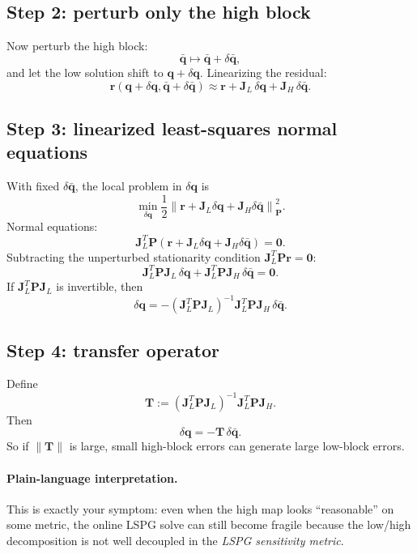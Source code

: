 \documentclass[11pt]{article}
\begin{document}
\subsection*{Step 2: perturb only the high block}
Now perturb the high block:
\[
\bar{\mathbf q}\mapsto \bar{\mathbf q}+\delta\bar{\mathbf q},
\]
and let the low solution shift to $\mathbf q+\delta\mathbf q$.
Linearizing the residual:
\[
\mathbf r(\mathbf q+\delta\mathbf q,\bar{\mathbf q}+\delta\bar{\mathbf q})
\approx
\mathbf r
+\mathbf J_L\,\delta\mathbf q
+\mathbf J_H\,\delta\bar{\mathbf q}.
\]

\subsection*{Step 3: linearized least-squares normal equations}
With fixed $\delta\bar{\mathbf q}$, the local problem in $\delta\mathbf q$ is
\[
\min_{\delta\mathbf q}
\frac12
\left\|
\mathbf r+\mathbf J_L\delta\mathbf q+\mathbf J_H\delta\bar{\mathbf q}
\right\|_{\mathbf P}^2.
\]
Normal equations:
\[
\mathbf J_L^T\mathbf P
\left(
\mathbf r+\mathbf J_L\delta\mathbf q+\mathbf J_H\delta\bar{\mathbf q}
\right)
=
\mathbf0.
\]
Subtracting the unperturbed stationarity condition $\mathbf J_L^T\mathbf P\mathbf r=\mathbf0$:
\[
\mathbf J_L^T\mathbf P\mathbf J_L\,\delta\mathbf q
+
\mathbf J_L^T\mathbf P\mathbf J_H\,\delta\bar{\mathbf q}
=
\mathbf0.
\]
If $\mathbf J_L^T\mathbf P\mathbf J_L$ is invertible, then
\[
\delta\mathbf q
=
-\left(\mathbf J_L^T\mathbf P\mathbf J_L\right)^{-1}
\mathbf J_L^T\mathbf P\mathbf J_H\,\delta\bar{\mathbf q}.
\]

\subsection*{Step 4: transfer operator}
Define
\[
\mathbf T
:=
\left(\mathbf J_L^T\mathbf P\mathbf J_L\right)^{-1}
\mathbf J_L^T\mathbf P\mathbf J_H.
\]
Then
\[
\delta\mathbf q=-\mathbf T\,\delta\bar{\mathbf q}.
\]
So if $\|\mathbf T\|$ is large, small high-block errors can generate large low-block errors.

\paragraph{Plain-language interpretation.}
This is exactly your symptom: even when the high map looks ``reasonable'' on some metric, the online LSPG solve can still become fragile because the low/high decomposition is not well decoupled in the \emph{LSPG sensitivity metric}.
\end{document}
